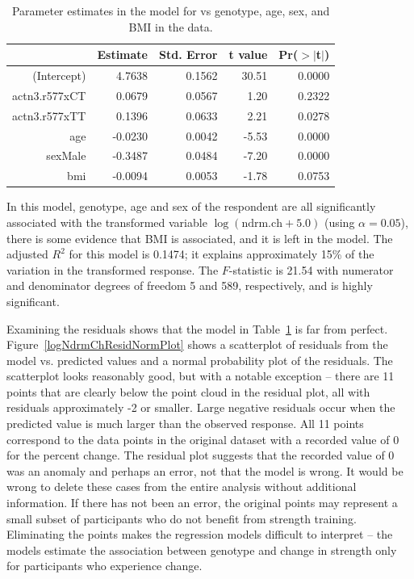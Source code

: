 \begin{table}[ht]
\centering
\begin{tabular}{rrrrr}
  \hline
 & Estimate & Std. Error & t value & Pr($>$$|$t$|$) \\ 
  \hline
(Intercept) & 4.7638 & 0.1562 & 30.51 & 0.0000 \\ 
  actn3.r577xCT & 0.0679 & 0.0567 & 1.20 & 0.2322 \\ 
  actn3.r577xTT & 0.1396 & 0.0633 & 2.21 & 0.0278 \\ 
  age & -0.0230 & 0.0042 & -5.53 & 0.0000 \\ 
  sexMale & -0.3487 & 0.0484 & -7.20 & 0.0000 \\ 
  bmi & -0.0094 & 0.0053 & -1.78 & 0.0753 \\ 
   \hline
\end{tabular}
\caption{Parameter estimates in the model for  vs genotype, age, sex, and BMI in the  data.}
\label{LogNdrmChACTN3AgeSexBmiRegression}
\end{table}



In this model, genotype, age and sex of the respondent are all significantly associated with the transformed variable $\log(\text{ndrm.ch} + 5.0)$ (using $\alpha = 0.05$), there is some evidence that BMI is associated, and it is left in the model.  The adjusted $R^2$ for this model is 0.1474; it explains approximately 15\% of the variation in the transformed response.  The $F$-statistic is 21.54 with numerator and denominator degrees of freedom 5 and 589, respectively, and is highly significant.


Examining the residuals shows that the model in Table~\ref{LogNdrmChACTN3AgeSexBmiRegression} is far from perfect.  Figure~\ref{logNdrmChResidNormPlot} shows a scatterplot of residuals from the model vs. predicted values and a normal probability plot of the residuals. The scatterplot looks reasonably good, but with a notable exception -- there are 11 points that are clearly below the point cloud in the residual plot, all with residuals approximately -2 or smaller.   Large negative residuals occur when the predicted value is much larger than the observed response.  All 11 points correspond to the data points in the original dataset with a recorded value of 0 for the percent change.  The residual plot suggests that the recorded value of 0 was an anomaly and perhaps an error, not that the model is wrong.  It would be wrong to delete these cases from the entire analysis without additional information. If there has not been an error, the original points may represent a small subset of participants who do not benefit from strength training.  Eliminating the points makes the regression models difficult to interpret  -- the models estimate the association between genotype and change in strength only for participants who experience change.

